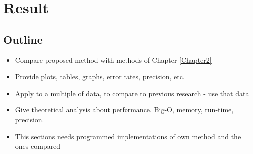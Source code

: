 
\chapter{Result}

\label{Chapter5} %


\section{Outline}
\begin{itemize}
  \item Compare proposed method with methods of Chapter \ref{Chapter2}
  \item Provide plots, tables, graphs, error rates, precision, etc.
  \item Apply to a multiple of data, to compare to previous research - use that data
  \item Give theoretical analysis about performance. Big-O, memory, run-time, precision.
  \item This sections needs programmed implementations of own method and the ones compared
\end{itemize}